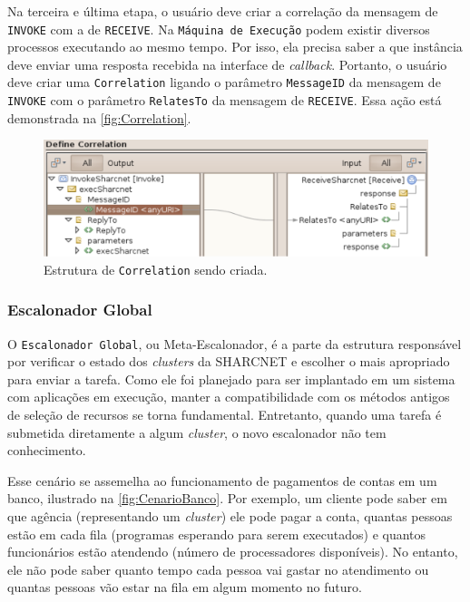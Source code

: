 \documentclass[12pt]{report} %
\begin{document}
	Na terceira e última etapa, o usuário deve criar a correlação da mensagem de \texttt{INVOKE} com a de \texttt{RECEIVE}.
	Na \texttt{Máquina de Execução} podem existir diversos processos executando ao mesmo tempo.
	Por isso, ela precisa saber a que instância deve enviar uma resposta recebida na interface de \textit{callback}.
	Portanto, o usuário deve criar uma \texttt{Correlation} ligando o parâmetro \texttt{MessageID} da mensagem de \texttt{INVOKE} com o parâmetro \texttt{RelatesTo} da mensagem de \texttt{RECEIVE}.
	Essa ação está demonstrada na \autoref{fig:Correlation}.
	
	\begin{figure}[!htb]%
	    \begin{center}
		\includegraphics[scale=0.50]{imagens/Correlation.pdf} 
		\caption{Estrutura de \texttt{Correlation} sendo criada.}
		\label{fig:Correlation}
	    \end{center}
	\end{figure}
	
	\pagebreak %
	\subsubsection{Escalonador Global}
	\label{subsec:EscalonadorGlobal}
	    O \texttt{Escalonador Global}, ou Meta-Escalonador, é a parte da estrutura responsável por verificar o estado dos \textit{clusters} da SHARCNET e escolher o mais apropriado para enviar a tarefa.
	    Como ele foi planejado para ser implantado em um sistema com aplicações em execução, manter a compatibilidade com os métodos antigos de seleção de recursos se torna fundamental.
	    Entretanto, quando uma tarefa é submetida diretamente a algum \textit{cluster}, o novo escalonador não tem conhecimento.
	    
	    Esse cenário se assemelha ao funcionamento de pagamentos de contas em um banco, ilustrado na \autoref{fig:CenarioBanco}.
	    Por exemplo, um cliente pode saber em que agência (representando um \textit{cluster}) ele pode pagar a conta, quantas pessoas estão em cada fila (programas esperando para serem executados) e quantos funcionários estão atendendo (número de processadores disponíveis).
	    No entanto, ele não pode saber quanto tempo cada pessoa vai gastar no atendimento ou quantas pessoas vão estar na fila em algum momento no futuro.
	    
\end{document}
